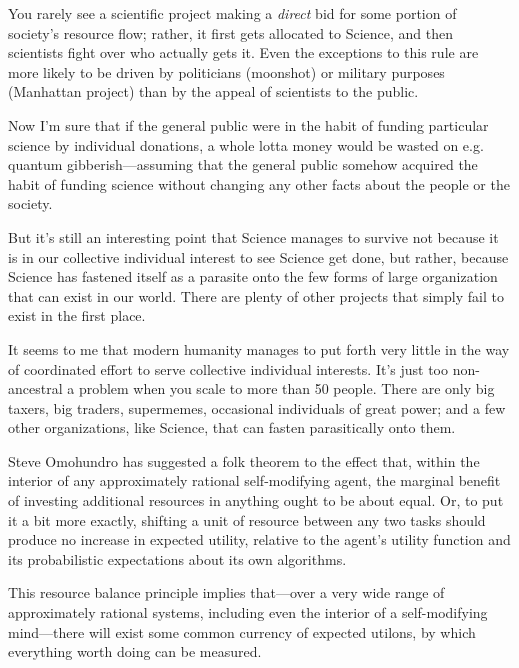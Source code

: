 {
 You rarely see a scientific project making a \textit{direct} bid
for some portion of society's resource flow; rather, it
first gets allocated to Science, and then scientists fight over who
actually gets it. Even the exceptions to this rule are more likely to
be driven by politicians (moonshot) or military purposes (Manhattan
project) than by the appeal of scientists to the public.}

{
 Now I'm sure that if the general public were in
the habit of funding particular science by individual donations, a
whole lotta money would be wasted on e.g. quantum gibberish---assuming
that the general public somehow acquired the habit of funding science
without changing any other facts about the people or the society.}

{
 But it's still an interesting point that Science
manages to survive not because it is in our collective individual
interest to see Science get done, but rather, because Science has
fastened itself as a parasite onto the few forms of large organization
that can exist in our world. There are plenty of other projects that
simply fail to exist in the first place.}

{
 It seems to me that modern humanity manages to put forth very
little in the way of coordinated effort to serve collective individual
interests. It's just too non-ancestral a problem when
you scale to more than 50 people. There are only big taxers, big
traders, supermemes, occasional individuals of great power; and a few
other organizations, like Science, that can fasten parasitically onto
them.}

\myendsectiontext


{
 Steve Omohundro has suggested a folk theorem to the effect that,
within the interior of any approximately rational self-modifying agent,
the marginal benefit of investing additional resources in anything
ought to be about equal. Or, to put it a bit more exactly, shifting a
unit of resource between any two tasks should produce no increase in
expected utility, relative to the agent's utility
function and its probabilistic expectations about its own algorithms. }

{
 This resource balance principle implies that---over a very wide
range of approximately rational systems, including even the interior of
a self-modifying mind---there will exist some common currency of
expected utilons, by which everything worth doing can be measured.}

